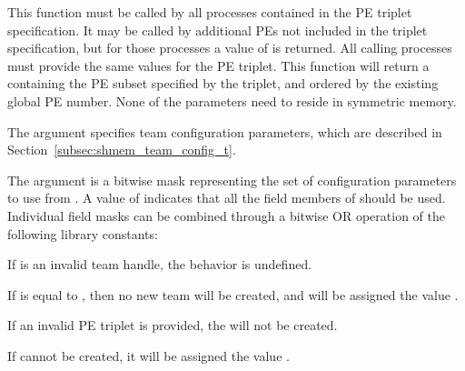 \begin{apidefinition}
{This function must be called by all processes contained in the \ac{PE} triplet
specification. It may be called by additional \acp{PE} not included in the
triplet specification, but for those processes a  value of
 is returned. All calling processes must provide the
same values for the \ac{PE} triplet. This function will return a 
containing the \ac{PE} subset specified by the triplet, and ordered by the
existing global \ac{PE} number. None of the parameters need to reside in
symmetric memory.

The  argument specifies team configuration parameters, which are
described in Section~\ref{subsec:shmem_team_config_t}.

The  argument is a bitwise mask representing the set of
configuration parameters to use from .
A  value of  indicates that all the field members
of  should be used.
Individual field masks can be combined through a bitwise OR operation
of the following library constants:

{
}

If  is an invalid team handle, the behavior is undefined.

If  is equal to , then no
new team will be created, and   will be assigned the value
.

If an invalid \ac{PE} triplet is provided, the  will not be created.

If  cannot be created, it will be assigned the value
.
}



\begin{apiexamples}

\end{apiexamples}

\end{apidefinition}
